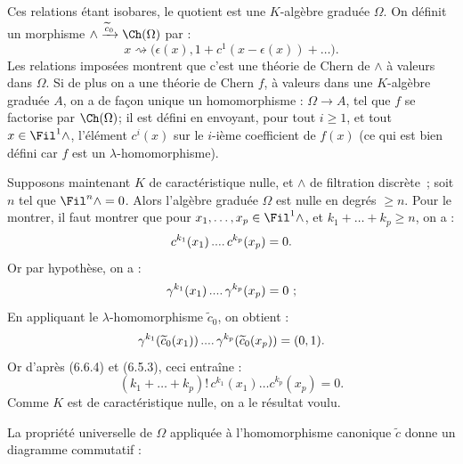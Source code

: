 

Ces
relations étant isobares, le quotient est une \(K\)-algèbre graduée \(\Omega\). On définit un morphisme \(\mathord{\wedge}\xrightarrow{\widetilde c_0}\Ch(\Omega)\) par :
\[
  x\rightsquigarrow
  \bigl(\epsilon(x),1+c^1(x-\epsilon(x))+\ldots\bigr).
\]
Les relations imposées montrent que c'est une théorie de Chern de \(\mathord{\wedge}\) à valeurs dans \(\Omega\). Si de plus on a une théorie de Chern \(f\), à valeurs dans une \(K\)-algèbre graduée \(A\), on a de façon unique un homomorphisme : \(\Omega\to A\), tel que \(f\) se factorise par \(\Ch(\Omega)\); il est défini en envoyant, pour tout \(i\ge1\), et tout \(x\in\Fil^1\mathord{\wedge}\), l'élément \(c^i(x)\) sur le \(i\)-ième coefficient de \(f(x)\) (ce qui est bien défini car \(f\) est un \(\lambda\)-homomorphisme).

Supposons maintenant \(K\) de caractéristique nulle, et \(\mathord{\wedge}\) de filtration discrète~; soit \(n\) tel que \(\Fil^n\mathord{\wedge}=0\). Alors l'algèbre graduée \(\Omega\) est nulle en degrés \(\ge n\). Pour le montrer, il faut montrer que pour \(x_1,\ldots,x_p\in\Fil^1\mathord{\wedge}\), et \(k_1+\ldots+k_p\ge n\), on a :
\[
  c^{k_1}(x_1)\mathinner{....}c^{k_p}(x_p)=0.
\]
Or par hypothèse, on a :
\[
  \gamma^{k_1}(x_1)\mathinner{....}\gamma^{k_p}(x_p)=0\ ;
\]
En appliquant le \(\lambda\)-homomorphisme \(\widetilde c_0\), on obtient :
\[
  \gamma^{k_1}(\widetilde c_0(x_1))\mathinner{....}
  \gamma^{k_p}(\widetilde c_0(x_p))=(0,1).
\]
Or d'après (6.6.4) et (6.5.3), ceci entraîne :
\[
  (k_1+\ldots+k_p)!\,
  c^{k_1}(x_1)\ldots c^{k_p}(x_p)=0.
\]
Comme \(K\) est de caractéristique nulle, on a le résultat voulu.

La propriété universelle de \(\Omega\) appliquée à l'homomorphisme canonique \(\widetilde c\) donne un diagramme commutatif :
